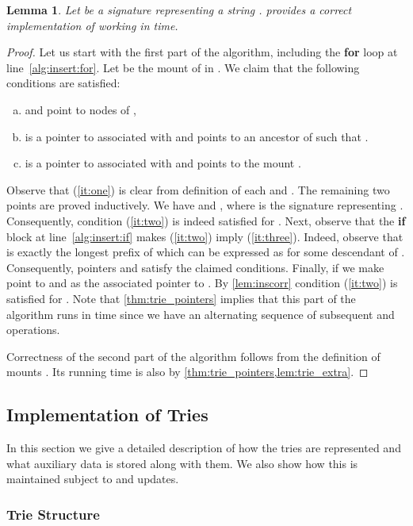 \documentclass[a4paper]{article}
\newtheorem{lemma}[theorem]{Lemma}
\theoremstyle{remark}
\begin{document}
\begin{lemma}\label{lem:trie_insert}
Let  be a signature representing a string .
 provides a correct implementation of 
working in  time.
\end{lemma}
\begin{proof}
Let us start with the first part of the algorithm, including the \textbf{for} loop at line~\ref{alg:insert:for}.
Let  be the mount of  in .
We claim that the following conditions are satisfied:
 \begin{enumerate}[(a)]
   \item\label{it:one}  and  point to nodes of ,
   \item\label{it:two}  is a pointer to  associated with  and  points to an ancestor  of  such that .
     \item\label{it:three}  is a pointer to  associated with  and  points to the mount .
 \end{enumerate}

Observe that (\ref{it:one}) is clear from definition of each  and .
The remaining two points are proved inductively.
We have  and , where  is the signature representing .
Consequently, condition (\ref{it:two}) is indeed satisfied for .
Next, observe that the \textbf{if} block at line~\ref{alg:insert:if} makes (\ref{it:two}) imply (\ref{it:three}).
Indeed, observe that  is exactly the longest prefix of  which can be expressed
as  for some descendant  of .
Consequently, pointers  and  satisfy the claimed conditions.
Finally, if  we make  point to  and  as the associated pointer to .
By \cref{lem:inscorr} condition (\ref{it:two}) is satisfied for .
Note that \cref{thm:trie_pointers} implies that this part of the algorithm runs in 
time since we have an alternating sequence of  subsequent  and  operations.

Correctness of the second part of the algorithm follows from the definition of mounts .
Its running time is also  by \cref{thm:trie_pointers,lem:trie_extra}.
\end{proof}

\subsection{Implementation of Tries}\label{sec:trierepr}
In this section we give a detailed description of how the tries  are represented
and what auxiliary data is stored along with them.
We also show how this is maintained subject to  and  updates.

\subsubsection{Trie Structure}
\end{document}
